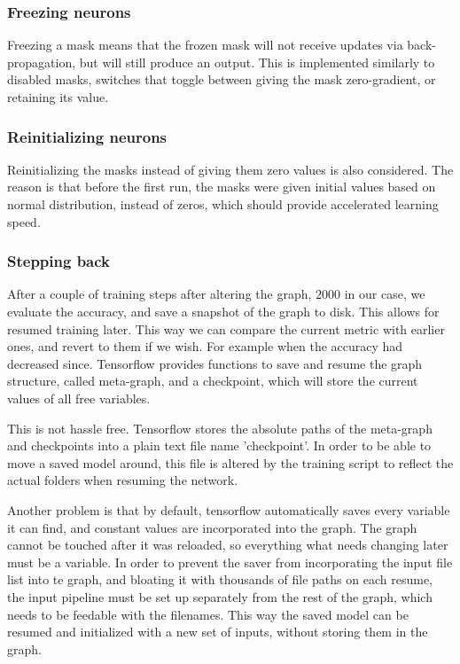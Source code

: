 \documentclass[12pt]{report}
\begin{document}
\subsubsection{Freezing neurons}
Freezing a mask means that the frozen mask will not receive updates via back-propagation, but will still produce an output. This is implemented similarly to disabled masks,  switches that toggle between giving the mask zero-gradient, or retaining its value.
\subsubsection{Reinitializing neurons}
Reinitializing the masks instead of giving them zero values is also considered. The reason is that before the first run, the masks were given initial values based on normal distribution, instead of zeros, which should provide accelerated learning speed.
\subsubsection{Stepping back}
After a couple of training steps after altering the graph, $2000$ in our case, we evaluate the accuracy, and save a snapshot of the graph to disk. This allows for resumed training later. This way we can compare the current metric with earlier ones, and revert to them if we wish. For example when the accuracy had decreased since. Tensorflow provides functions to save and resume the graph structure, called meta-graph, and a checkpoint, which will store the current values of all free variables.

This is not hassle free. Tensorflow stores the absolute paths of the meta-graph and checkpoints into a plain text file name 'checkpoint'. In order to be able to move a saved model around, this file is altered by the training script to reflect the actual folders when resuming the network.

Another problem is that by default, tensorflow automatically saves every variable it can find, and constant values are incorporated into the graph. The graph cannot be touched after it was reloaded, so everything what needs changing later must be a variable. In order to prevent the saver from incorporating the input file list into te graph, and bloating it with thousands of file paths on each resume, the input pipeline must be set up separately from the rest of the graph, which needs to be feedable with the filenames. This way the saved model can be resumed and initialized with a new set of inputs, without storing them in the graph.
\end{document}
